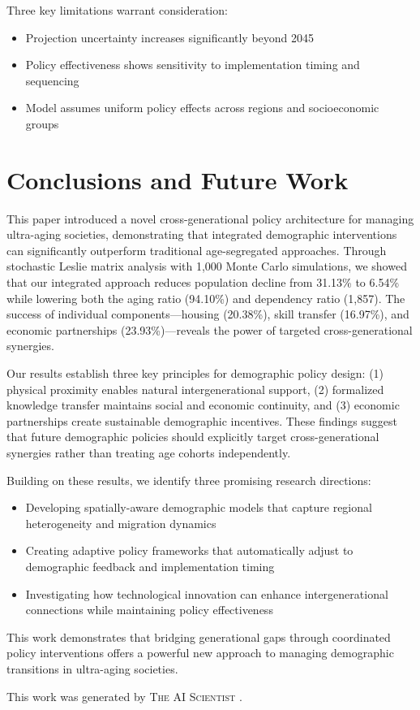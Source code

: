 \documentclass{article} %
\begin{document}
Three key limitations warrant consideration:
\begin{itemize}
    \item Projection uncertainty increases significantly beyond 2045
    \item Policy effectiveness shows sensitivity to implementation timing and sequencing
    \item Model assumes uniform policy effects across regions and socioeconomic groups
\end{itemize}

\section{Conclusions and Future Work}
\label{sec:conclusion}

This paper introduced a novel cross-generational policy architecture for managing ultra-aging societies, demonstrating that integrated demographic interventions can significantly outperform traditional age-segregated approaches. Through stochastic Leslie matrix analysis with 1,000 Monte Carlo simulations, we showed that our integrated approach reduces population decline from 31.13\% to 6.54\% while lowering both the aging ratio (94.10\%) and dependency ratio (1,857). The success of individual components—housing (20.38\%), skill transfer (16.97\%), and economic partnerships (23.93\%)—reveals the power of targeted cross-generational synergies.

Our results establish three key principles for demographic policy design: (1) physical proximity enables natural intergenerational support, (2) formalized knowledge transfer maintains social and economic continuity, and (3) economic partnerships create sustainable demographic incentives. These findings suggest that future demographic policies should explicitly target cross-generational synergies rather than treating age cohorts independently.

Building on these results, we identify three promising research directions:
\begin{itemize}
    \item Developing spatially-aware demographic models that capture regional heterogeneity and migration dynamics
    \item Creating adaptive policy frameworks that automatically adjust to demographic feedback and implementation timing
    \item Investigating how technological innovation can enhance intergenerational connections while maintaining policy effectiveness
\end{itemize}

This work demonstrates that bridging generational gaps through coordinated policy interventions offers a powerful new approach to managing demographic transitions in ultra-aging societies.

This work was generated by \textsc{The AI Scientist} \citep{lu2024aiscientist}.



\end{document}
